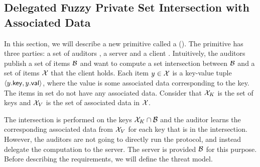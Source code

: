 %
%
%



\iffalse
\subsection{Delegated Fuzzy Private Set Intersection with Associated Data}
%
In this section, we will describe a new primitive called a \dPSIPrimitive (\dPSI). The primitive 
has three parties: a set of auditors \auditor, a server \server and a client \client. Intuitively, 
the auditors publish a set of items $\blocklist$ and want to compute a set intersection between 
$\blocklist$ and a set of items $\cInputSet$ that the client holds. Each item $\genericCInputElmt 
\in \cInputSet$ is a key-value tuple $\tupleDefn{\genericCInputElmt.\keyLabel, 
\genericCInputElmt.\valueLabel}$, where the value is some associated data corresponding to the 
key. The items in set \blocklist do not have any associated data. 
Consider that $\keySetLabel$ is the set of keys and 
$\valSetLabel$ is the set of associated data in $\cInputSet$. 


The intersection is performed on the keys $\keySetLabel \cap \blocklist$ 
and the auditor learns the corresponding associated data from $\valSetLabel$
for each key that is in the intersection. However, the 
auditors are not going to directly run the protocol, and instead delegate the computation to the 
server. The server is provided $\blocklist$ for this purpose. Before describing the requirements, we 
will define the 
threat model. 


